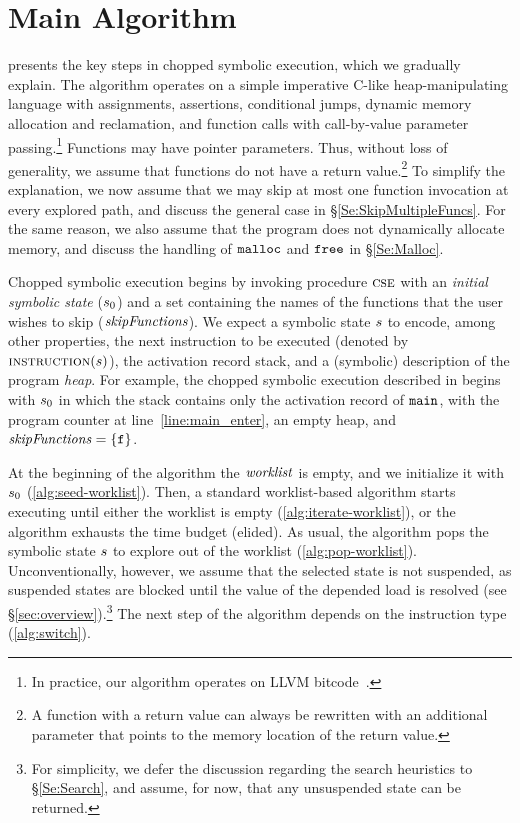

\section{Main Algorithm}



 presents the key steps in chopped
symbolic execution, which we gradually explain. The algorithm operates
on a simple imperative C-like heap-manipulating language with
assignments, assertions, conditional jumps, dynamic memory allocation
and reclamation, and function calls with call-by-value parameter
passing.\footnote{In practice, our algorithm operates on LLVM
  bitcode~\cite{llvm}.}  Functions may have pointer parameters. Thus,
without loss of generality, we assume that functions do not have a
return value.\footnote{A function with a return value can always be
  rewritten with an additional parameter that points to the memory
  location of the return value.}  To simplify the explanation, we now
assume that we may skip at most one function invocation at every
explored path, and discuss the general case in
\S\ref{Se:SkipMultipleFuncs}. For the same reason, we also assume that
the program does not dynamically allocate memory, and discuss the
handling of $\texttt{malloc}$ and $\texttt{free}$ in \S\ref{Se:Malloc}.

Chopped symbolic execution begins by invoking procedure $\textsc{cse}$
with an \emph{initial symbolic state} ($s_0$) and a set
containing the names of the functions that the user wishes to skip
($\mathit{skipFunctions}$). We expect a symbolic state $s$ to encode,
among other properties, the next instruction to be executed (denoted
by $\Call{instruction}{\workstate}$), the activation record stack, and
a (symbolic) description of the program \emph{heap}. For example, the
chopped symbolic execution described in  begins
with $s_0$ in which the stack contains only the activation record
of $\texttt{main}$, with the program counter at
line~\ref{line:main_enter}, an empty heap, and
$\mathit{skipFunctions} = \{ \texttt{f} \}$.

At the beginning of the algorithm the $\mathit{worklist}$ is empty, and we
initialize it with $s_0$ (\cref{alg:seed-worklist}). Then, a
standard worklist-based algorithm starts executing until either the
worklist is empty (\cref{alg:iterate-worklist}), or the algorithm
exhausts the time budget (elided). As usual, the algorithm pops the
symbolic state $s$ to explore out of the worklist
(\cref{alg:pop-worklist}). Unconventionally, however, we assume that
the selected state is not suspended, as suspended states are blocked
until the value of the depended load is resolved (see
\S\ref{sec:overview}).\footnote{For simplicity, we defer the
  discussion regarding the search heuristics to \S\ref{Se:Search}, and
  assume, for now, that any unsuspended state can be returned.}  The
next step of the algorithm depends on the instruction type
(\cref{alg:switch}).

